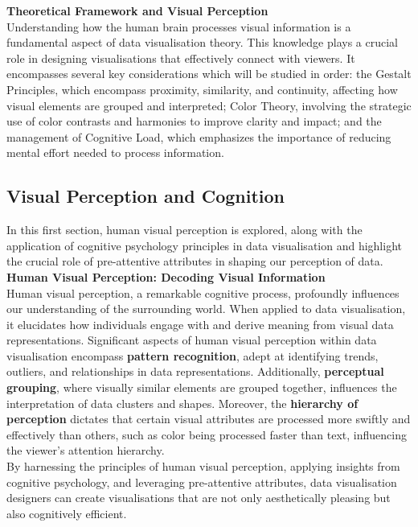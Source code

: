 \documentclass{article}\usepackage[]{graphicx}\usepackage[]{xcolor}
\begin{document}
\noindent 
\textbf{Theoretical Framework and Visual Perception}\\

\noindent
Understanding how the human brain processes visual information is a fundamental aspect of data visualisation theory. This knowledge plays a crucial role in designing visualisations that effectively connect with viewers. It encompasses several key considerations which will be studied in order: the Gestalt Principles, which encompass proximity, similarity, and continuity, affecting how visual elements are grouped and interpreted; Color Theory, involving the strategic use of color contrasts and harmonies to improve clarity and impact; and the management of Cognitive Load, which emphasizes the importance of reducing mental effort needed to process information.\\

\subsection{Visual Perception and Cognition}

In this first section, human visual perception is explored, along with the application of cognitive psychology principles in data visualisation and highlight the crucial role of pre-attentive attributes in shaping our perception of data.\\ 

\noindent 
\textbf{Human Visual Perception: Decoding Visual Information}\\

\noindent
Human visual perception, a remarkable cognitive process, profoundly influences our understanding of the surrounding world. When applied to data visualisation, it elucidates how individuals engage with and derive meaning from visual data representations. Significant aspects of human visual perception within data visualisation encompass \textbf{pattern recognition}, adept at identifying trends, outliers, and relationships in data representations. Additionally, \textbf{perceptual grouping}, where visually similar elements are grouped together, influences the interpretation of data clusters and shapes. Moreover, the \textbf{hierarchy of perception} dictates that certain visual attributes are processed more swiftly and effectively than others, such as color being processed faster than text, influencing the viewer's attention hierarchy.\\

\noindent
By harnessing the principles of human visual perception, applying insights from cognitive psychology, and leveraging pre-attentive attributes, data visualisation designers can create visualisations that are not only aesthetically pleasing but also cognitively efficient.	
\end{document}
